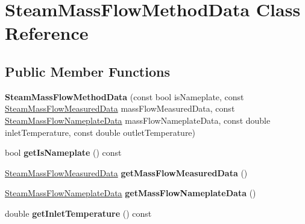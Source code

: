 \hypertarget{class_steam_mass_flow_method_data}{}\section{Steam\+Mass\+Flow\+Method\+Data Class Reference}
\label{class_steam_mass_flow_method_data}
\subsection*{Public Member Functions}
\begin{DoxyCompactItemize}
\item 
\mbox{\label{class_steam_mass_flow_method_data_a00d8f1917c439b0b0ccaa6ceae8b8fe6}} 
{\bfseries Steam\+Mass\+Flow\+Method\+Data} (const bool is\+Nameplate, const \hyperlink{class_steam_mass_flow_measured_data}{Steam\+Mass\+Flow\+Measured\+Data} mass\+Flow\+Measured\+Data, const \hyperlink{class_steam_mass_flow_nameplate_data}{Steam\+Mass\+Flow\+Nameplate\+Data} mass\+Flow\+Nameplate\+Data, const double inlet\+Temperature, const double outlet\+Temperature)
\item 
\mbox{\label{class_steam_mass_flow_method_data_adfbfa5ce4fa4d7ea0d35b2a60d6d117a}} 
bool {\bfseries get\+Is\+Nameplate} () const
\item 
\mbox{\label{class_steam_mass_flow_method_data_a5cd24d82a93883a7736dfed6faf6e8d8}} 
\hyperlink{class_steam_mass_flow_measured_data}{Steam\+Mass\+Flow\+Measured\+Data} {\bfseries get\+Mass\+Flow\+Measured\+Data} ()
\item 
\mbox{\label{class_steam_mass_flow_method_data_afd8082bfcb1d701c7b0da01457b97a88}} 
\hyperlink{class_steam_mass_flow_nameplate_data}{Steam\+Mass\+Flow\+Nameplate\+Data} {\bfseries get\+Mass\+Flow\+Nameplate\+Data} ()
\item 
\mbox{\label{class_steam_mass_flow_method_data_a4029950bd73f51a58b7ff42a6b6814e9}} 
double {\bfseries get\+Inlet\+Temperature} () const
\item 
\mbox{\label{class_steam_mass_flow_method_data_a6fb7efd7f7195fd63e0a23e83ebfdcea}} 

\end{DoxyCompactItemize}
